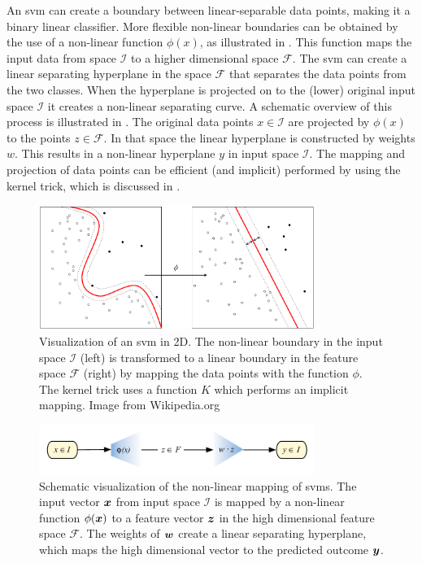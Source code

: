 An \gls{svm} can create a boundary between linear-separable data points, making it a binary linear classifier.
More flexible non-linear boundaries can be obtained by the use of a non-linear function $\phi(x)$, as illustrated in .
This function maps the input data from space $\mathcal{I}$ to a higher dimensional space $\mathcal{F}$.
The \gls{svm} can create a linear separating hyperplane in the space $\mathcal{F}$ that separates the data points from the two classes.
When the hyperplane is projected on to the (lower) original input space $\mathcal{I}$ it creates a non-linear separating curve.
A schematic overview of this process is illustrated in .
The original data points $x \in \mathcal{I}$ are projected by $\phi(x)$ to the points $z \in \mathcal{F}$.
In that space the linear hyperplane is constructed by weights $w$.
This results in a non-linear hyperplane $y$ in input space $\mathcal{I}$.
The mapping and projection of data points can be efficient (and implicit) performed by using the kernel trick, which is discussed in .

\begin{figure}
\centering
  \includegraphics[width=0.8\textwidth]{./Figures/chapter3/svm_kernel_mapping.png}
  \caption[Kernel mapping]{Visualization of an \gls{svm} in 2D.
  The non-linear boundary in the input space $\mathcal{I}$ (left) is transformed to a linear boundary in the feature space $\mathcal{F}$ (right) by mapping the data points with the function $\phi$.
  The kernel trick uses a function $K$ which performs an implicit mapping. Image from Wikipedia.org}
  \label{fig:kernel_mapping}
\end{figure}

\begin{figure}
\centering
  \includegraphics[width=0.8\textwidth]{./Figures/chapter3/svm_mapping_spaces.pdf}
  \caption[Mapping spaces in Support Vector Machines]{Schematic visualization of the non-linear mapping of \glspl{svm}.
  The input vector $\vectorsym{x}$ from input space $\mathcal{I}$ is mapped by a non-linear function $\phi(\vectorsym{x})$ to a feature vector $\vectorsym{z}$ in the high dimensional feature space $\mathcal{F}$.
  The weights of $\vectorsym{w}$ create a linear separating hyperplane, which maps the high dimensional vector to the predicted outcome $\vectorsym{y}$.}
  \label{fig:svm_mapping_spaces}
\end{figure}

